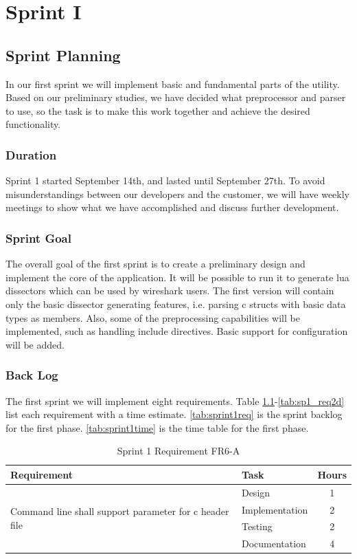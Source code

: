 \chapter{Sprint I}


\section{Sprint Planning}
In our first sprint we will implement basic and fundamental parts of the
\gls{utility}. Based on our preliminary studies, we have decided what \gls{preprocessor}
and \gls{parser} to use, so the task is to make this work together and achieve the
desired functionality.

\subsection{Duration}
Sprint 1 started September 14th, and lasted until September 27th. To avoid
misunderstandings between our developers and the customer, we will have weekly
meetings to show what we have accomplished and discuss further development. 

\subsection{Sprint Goal}
The overall goal of the first sprint is to create a preliminary design and
implement the core of the application. It will be possible to run it to
generate \Gls{lua} \glspl{dissector} which can be used by \Gls{wireshark} users. The first
version will contain only the basic \gls{dissector} generating features, i.e.
parsing \Gls{c} \glspl{struct} with basic data types as \glspl{member}. Also, some of the
preprocessing capabilities will be implemented, such as handling \gls{include}
directives. Basic support for configuration will be added.

\subsection{Back Log}
The first sprint we will implement eight requirements. Table
\ref{tab:sp1_req7a}-\ref{tab:sp1_req2d}  list each requirement with a time
estimate. \autoref{tab:sprint1req} is the sprint backlog for the first phase.
\autoref{tab:sprint1time} is the time table for the first phase.

\begin{table}[!ht] \small \center
\caption{Sprint 1 Requirement FR6-A\label{tab:sp1_req7a}}
\begin{tabular}{l l c}
	\toprule
	Requirement & Task & Hours \\
	\midrule
	\multirow{4}{5cm}{Command line shall support parameter for \Gls{c} \gls{header} file} & Design & 1 \\
	& Implementation & 2 \\
	& Testing & 2 \\
	& Documentation & 4 \\
	\bottomrule
\end{tabular}
\end{table}

